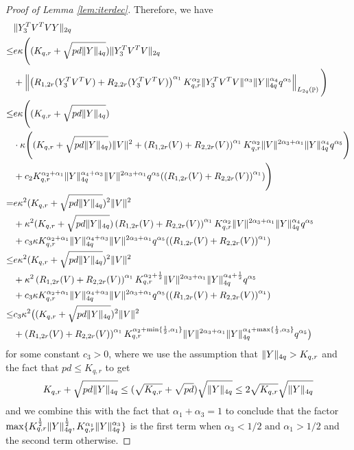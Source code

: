 \documentclass[11pt]{amsart}
\numberwithin{equation}{section}
\numberwithin{equation}{section}
\DeclareMathOperator{\Pb}{\mathbb{P}}
\DeclarePairedDelimiter{\norm}{\lVert}{\rVert}
\newcommand{\norml}[1]{\left\lVert#1\right\rVert}
\begin{document}
\begin{proof}[Proof of Lemma \ref{lem:iterdec}]
Therefore, we have
    \begin{align*}
    &\norm{Y_3^TV^TVY}_{2q} \\\le& e\kappa \Bigg((K_{q,r}+\sqrt{pd\norm{Y}_{4q}})\norm{Y_3^TV^TV}_{2q} \\&+ \norml{\left(R_{1,2r}(Y_3^TV^TV)+R_{2,2r}(Y_3^TV^TV)\right)^{\alpha_1}K_{q,r}^{\alpha_2}\norm{Y_3^TV^TV}^{\alpha_3} \norm{Y}_{4q} ^{\alpha_4}q^{\alpha_5}}_{L_{2q}(\Pb)}\Bigg)
    \\ \le & e\kappa \Bigg((K_{q,r}+\sqrt{pd\norm{Y}_{4q}}) \\& \cdot \kappa \Bigg((K_{q,r}+\sqrt{pd\norm{Y}_{4q}})\norm{V}^2 + \left(R_{1,2r}(V)+R_{2,2r}(V)\right)^{\alpha_1}K_{q,r}^{\alpha_2}\norm{V}^{2\alpha_3+\alpha_1} \norm{Y}_{4q}^{\alpha_4}q^{\alpha_5}\Bigg) \\&+ c_2 K_{q,r}^{\alpha_2+\alpha_1}\norm{Y}_{4q}^{\alpha_4+\alpha_3}\norm{V}^{2 \alpha_3+\alpha_1}q^{\alpha_5}(\left(R_{1,2r}(V)+R_{2,2r}(V)\right)^{\alpha_1})\Bigg)
    \\ = & e\kappa^2 (K_{q,r}+\sqrt{pd\norm{Y}_{4q}})^2 \norm{V}^2 \\&+ \kappa^2 (K_{q,r}+\sqrt{pd\norm{Y}_{4q}})\left(R_{1,2r}(V)+R_{2,2r}(V)\right)^{\alpha_1}K_{q,r}^{\alpha_2}\norm{V}^{2\alpha_3+\alpha_1} \norm{Y}_{4q}^{\alpha_4}q^{\alpha_5} \\& + c_3 \kappa K_{q,r}^{\alpha_2+\alpha_1}\norm{Y}_{4q}^{\alpha_4+\alpha_3}\norm{V}^{2 \alpha_3+\alpha_1}q^{\alpha_5}(\left(R_{1,2r}(V)+R_{2,2r}(V)\right)^{\alpha_1})
\\ \le  & e\kappa^2 (K_{q,r}+\sqrt{pd\norm{Y}_{4q}})^2 \norm{V}^2 \\&+ \kappa^2 \left(R_{1,2r}(V)+R_{2,2r}(V)\right)^{\alpha_1}K_{q,r}^{\alpha_2+\frac{1}{2}}\norm{V}^{2\alpha_3+\alpha_1} \norm{Y}_{4q}^{\alpha_4+\frac{1}{2}}q^{\alpha_5} \\& + c_3 \kappa K_{q,r}^{\alpha_2+\alpha_1}\norm{Y}_{4q}^{\alpha_4+\alpha_3}\norm{V}^{2 \alpha_3+\alpha_1}q^{\alpha_5}(\left(R_{1,2r}(V)+R_{2,2r}(V)\right)^{\alpha_1})
\\ \le  & c_3\kappa^2 \big((K_{q,r}+\sqrt{pd\norm{Y}_{4q}})^2 \norm{V}^2 \\&+ \left(R_{1,2r}(V)+R_{2,2r}(V)\right)^{\alpha_1}K_{q,r}^{\alpha_2+\min\{\frac{1}{2},\alpha_1\}}\norm{V}^{2\alpha_3+\alpha_1} \norm{Y}_{4q}^{\alpha_4+\max\{\frac{1}{2},\alpha_3\}}q^{\alpha_5} \big)
\end{align*}
for some constant $c_3>0$,
where we use the assumption that $\norm{Y}_{4q}>K_{q,r}$ and the fact that $pd \le K_{q,r}$ to get
\begin{align*}
    K_{q,r}+\sqrt{pd\norm{Y}_{4q}} \le (\sqrt{K_{q,r}} + \sqrt{pd})\sqrt{\norm{Y}_{4q}} \le 2 \sqrt{K_{q,r}}\sqrt{\norm{Y}_{4q}}
\end{align*}
and we combine this with the fact that $\alpha_1+\alpha_3=1$ to conclude that the factor $\max \{ K_{q,r}^{\frac{1}{2}} \norm{Y}_{4q}^{\frac{1}{2}}, K_{q,r}^{\alpha_1} \norm{Y}_{4q}^{\alpha_3} \}$
is the first term when $\alpha_3<1/2 \text{ and } \alpha_1 >1/2$ and the second term otherwise. 



\end{proof}
\end{document}
